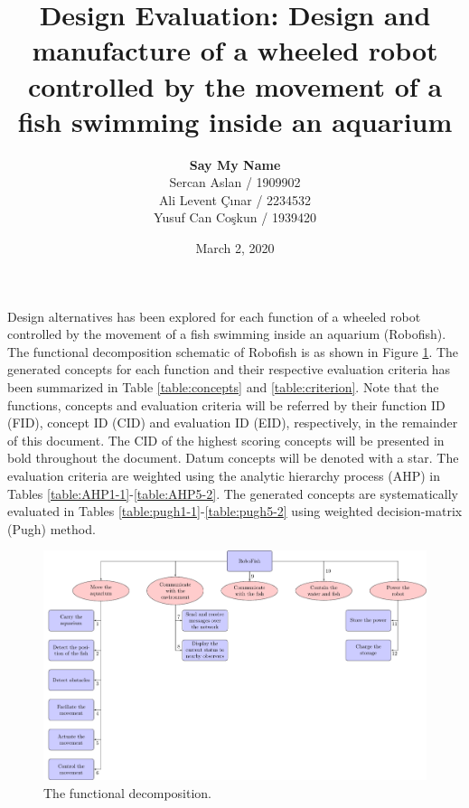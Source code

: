 \documentclass[a4paper, 10pt, DIV=16, parskip = full, twocolumn = false]{scrartcl}
\title{Design Evaluation: Design and manufacture of a wheeled robot controlled by the movement of a fish swimming inside an aquarium}
\author{\textbf{Say My Name} \\ Sercan Aslan / 1909902 \\ Ali Levent Çınar / 2234532 \\ Yusuf Can Coşkun / 1939420}
\date{March 2, 2020}
\begin{document}
	\maketitle
	\thispagestyle{scrheadings}


Design alternatives has been explored for each function of a wheeled robot controlled by the movement of a fish swimming inside an aquarium (Robofish). The functional decomposition schematic of Robofish is as shown in Figure \ref{fig:funcdecomp}. The generated concepts for each function and their respective evaluation criteria has been summarized in Table \ref{table:concepts} and \ref{table:criterion}. Note that the functions, concepts and evaluation criteria will be referred by their function ID (FID), concept ID (CID) and evaluation ID (EID), respectively, in the remainder of this document. The CID of the highest scoring concepts will be presented in bold throughout the document. Datum concepts will be denoted with a star. The evaluation criteria are weighted using the analytic hierarchy process (AHP) in Tables \ref{table:AHP1-1}-\ref{table:AHP5-2}. The generated concepts are systematically evaluated in Tables \ref{table:pugh1-1}-\ref{table:pugh5-2} using weighted decision-matrix (Pugh) method.

\begin{figure}[!h]
	\centering
	\includegraphics[width=0.9\columnwidth]{../functional_decomposition/functional_decomposition.pdf}
	\caption{The functional decomposition.}
	\label{fig:funcdecomp}
\end{figure}
\end{document}
